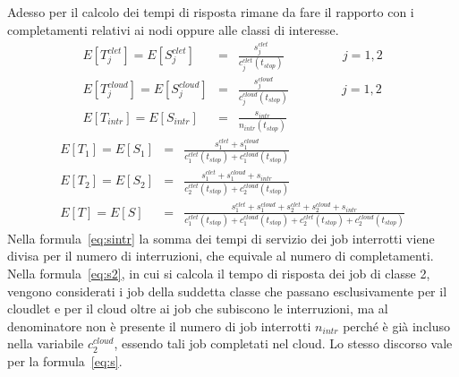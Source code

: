 Adesso per il calcolo dei tempi di risposta rimane da fare il rapporto con i
completamenti relativi ai nodi oppure alle classi di interesse.
%
{\setlength\arraycolsep{2pt}
\begin{eqnarray}
\label{eq:sjclet}
E[T_j^{clet}] = E[S_j^{clet}] &=& \frac{s_j^{clet}}{c_j^{clet}(t_{stop})}
\ \qquad \ \qquad \ j = 1, 2 
\\[10pt]
\label{eq:sjcloud}
E[T_j^{cloud}] = E[S_j^{cloud}] &=&
\frac{s_j^{cloud}}{c_j^{cloud}(t_{stop})}
\qquad \ \qquad j = 1, 2 
\\[10pt]
\label{eq:sintr}
E[T_{intr}] = E[S_{intr}] & = &
\frac{s_{intr}}{n_{intr}(t_{stop})}
\end{eqnarray}}
{\setlength\arraycolsep{2pt}
\begin{eqnarray}
\label{eq:s1}
E[T_1] = E[S_1] & = &
\frac{s_1^{clet} + s_1^{cloud}}{c_1^{clet}(t_{stop}) + c_1^{cloud}(t_{stop})}
\\[10pt]
\label{eq:s2}
E[T_2] = E[S_2] & = &
\frac{s_1^{clet} + s_1^{cloud} + s_{intr}}{c_2^{clet}(t_{stop}) +
c_2^{cloud}(t_{stop})} \\[10pt]
\label{eq:s}
E[T] = E[S] & = &
\frac{s_1^{clet} + s_1^{cloud} + s_2^{clet} + s_2^{cloud} + s_{intr}}
{c_1^{clet}(t_{stop}) + c_1^{cloud}(t_{stop}) + c_2^{clet}(t_{stop}) +
c_2^{cloud}(t_{stop})} \end{eqnarray}}
%
Nella formula~\ref{eq:sintr} la somma dei tempi di servizio dei job interrotti
viene divisa per il numero di interruzioni, che equivale al numero di
completamenti.\\
Nella formula~\ref{eq:s2}, in cui si calcola il tempo di risposta dei job di
classe 2, vengono considerati i job della suddetta classe che passano
esclusivamente per il cloudlet e per il cloud oltre ai job che subiscono le
interruzioni, ma al denominatore non è presente il numero di job interrotti
$n_{intr}$ perché è già incluso nella variabile $c_2^{cloud}$, essendo tali job
completati nel cloud. Lo stesso discorso vale per la formula~\ref{eq:s}.
%
